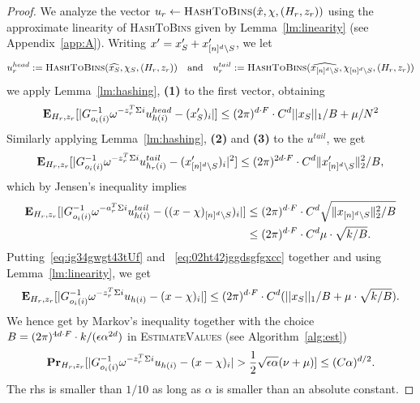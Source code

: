 \begin{proof}
We analyze  the vector $u_{r} \gets \Call{HashToBins}{\hat x, \chi, (H_r, z_r)}$ using the approximate linearity of \textsc{HashToBins} given by Lemma~\ref{lm:linearity} (see Appendix~\ref{app:A}).  Writing $x'=x'_S+x'_{\nsq\setminus S}$, we let 
$$
u^{head}_r:=\Call{HashToBins}{\widehat{x_S}, \chi_S, (H_r, z_r)}\text{~~~and~~~}u^{tail}_r:=\Call{HashToBins}{\widehat{x_{\nsq\setminus S}}, \chi_{\nsq\setminus S}, (H_r, z_r)}
$$
we apply Lemma~\ref{lm:hashing}, {\bf (1)} to the first vector, obtaining 
\begin{equation}\label{eq:ig34gwgt43tUf}
\expect_{H_r, z_r}[\abs{G_{o_i(i)}^{-1}\omega^{-z_r^T\Sigma i}u^{head}_{h(i)} - (x'_S)_i}]\leq \GS\cdot C^d ||x_S||_1/B+\mu/N^2
\end{equation} 
Similarly applying Lemma~\ref{lm:hashing}, {\bf (2)} and {\bf (3)} to the $u^{tail}$, we get
\begin{equation*}
\expect_{H_r, z_r}[\abs{G_{o_i(i)}^{-1}\omega^{-z_r^T\Sigma i}u^{tail}_{h_r(i)} - (x'_{\nsq\setminus S})_i}^2]\leq \GSS\cdot C^d \norm{2}{x'_{\nsq\setminus S}}^2/B,
\end{equation*} 
which by Jensen's inequality implies 
\begin{equation}\label{eq:02ht42jggdsgfgxcc}
\begin{split}
\expect_{H_r, z_r}[\abs{G_{o_i(i)}^{-1}\omega^{-a_r^T\Sigma i}u^{tail}_{h(i)} - ((x-\chi)_{\nsq\setminus S})_i}]&\leq \GS\cdot C^d \sqrt{\norm{2}{x_{\nsq\setminus S}}^2/B}\\
&\leq \GS\cdot C^d \mu\cdot \sqrt{k/B}.
\end{split}
\end{equation}
 Putting~\eqref{eq:ig34gwgt43tUf} and ~\eqref{eq:02ht42jggdsgfgxcc} together and using Lemma~\ref{lm:linearity}, we get 
\begin{equation}\label{eq:02ht42jggdsggggrg344c}
\expect_{H_r, z_r}[\abs{G_{o_i(i)}^{-1}\omega^{-z_r^T\Sigma i}u_{h(i)} - (x-\chi)_i}]\leq \GS\cdot C^d (||x_S||_1/B+\mu \cdot \sqrt{k/B}).
\end{equation}
We hence get by Markov's inequality together with the choice $B=\GT\cdot k/(\e \alpha^{2d})$ in \textsc{EstimateValues} (see Algorithm~\ref{alg:est})
\begin{equation}\label{eq:geropghj3g34t}
\prob_{H_r, z_r}[\abs{G_{o_i(i)}^{-1}\omega^{-z_r^T\Sigma i}u_{h(i)} - (x-\chi)_i}>\frac1{2}\sqrt{\e \alpha}(\nu+\mu)]\leq (C\alpha)^{d/2}.
\end{equation}
The rhs is smaller than $1/10$ as long as $\alpha$ is smaller than an absolute constant. 


\end{proof}
